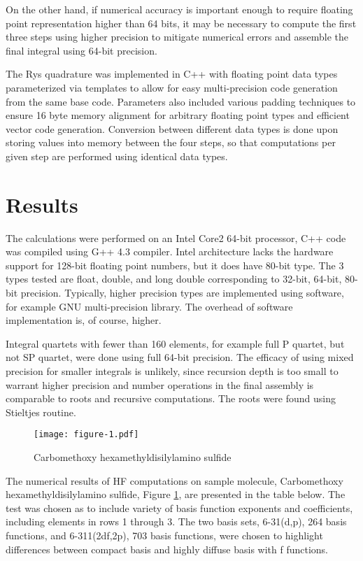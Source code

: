 \documentclass[12pt]{article}
\begin{document}
On the other hand, if numerical accuracy is important enough to require floating point representation higher than 64 bits, it may be necessary to compute the first three steps using higher precision to mitigate numerical errors and assemble the final integral using 64-bit precision.

The Rys quadrature was implemented in C++ with floating point data types parameterized via templates to allow for easy multi-precision code generation from the same base code. 
Parameters also included various padding techniques to ensure 16 byte memory alignment for arbitrary floating point types and efficient vector code generation. 
Conversion between different data types is done upon storing values into memory between the four steps, so that computations per given step are performed using identical data types. 


\section{Results}
The calculations were performed on an  Intel Core2 64-bit processor,
C++ code was compiled using G++ 4.3 compiler. 
Intel architecture lacks the hardware support for 128-bit floating point numbers,  but it does have 80-bit type.
The 3 types tested are float, double, and long double corresponding to  32-bit, 64-bit, 80-bit precision. 
Typically, higher precision types are implemented using software, for example GNU multi-precision library.  The overhead of software implementation is, of course, higher.  

Integral quartets with fewer than 160  elements, for example full P quartet,
but not SP quartet, were done using full 64-bit precision. The efficacy of using mixed precision for smaller integrals is unlikely, since 
recursion depth is too small to warrant higher precision and number operations in the final assembly is comparable to roots and recursive computations.  The roots were found
using Stieltjes routine.

\begin{figure}
  \begin{center}
    \texttt{[image: figure-1.pdf]}
  \end{center}
  \caption{Carbomethoxy hexamethyldisilylamino sulfide}
\label{figure:1}
\end{figure}

The numerical results of HF computations on sample molecule,
Carbomethoxy hexamethyldisilylamino sulfide, Figure \ref{figure:1},
 are presented in the table below. 
The test was chosen as to include variety of basis function exponents and coefficients, including elements in  rows 1 through 3.
The two basis sets, 6-31(d,p), 264 basis functions, and 6-311(2df,2p), 703 basis functions, were chosen to highlight differences between compact basis and highly diffuse basis with f functions.
\end{document}
